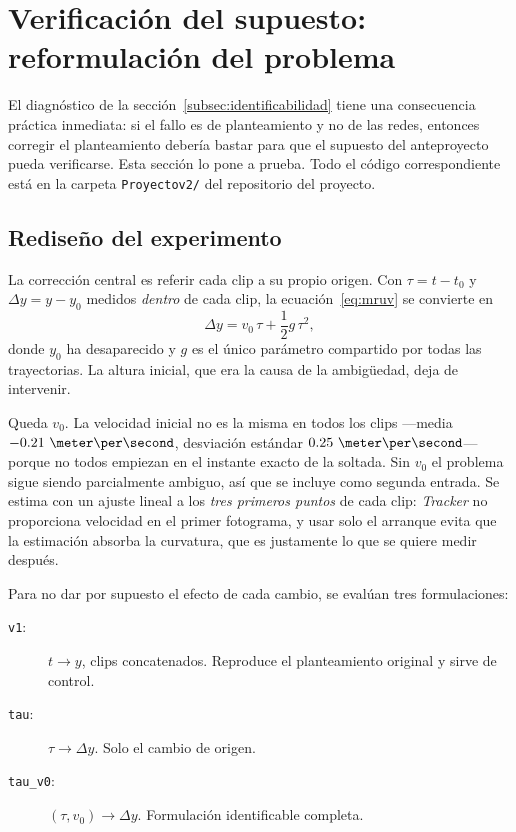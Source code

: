 \documentclass[titlepage,11pt]{article}
\providecommand{\num}[1]{\ensuremath{#1}}
\begin{document}
\section{Verificación del supuesto: reformulación del problema}
\label{sec:v2}

El diagnóstico de la sección~\ref{subsec:identificabilidad} tiene una
consecuencia práctica inmediata: si el fallo es de planteamiento y no de las
redes, entonces corregir el planteamiento debería bastar para que el supuesto
del anteproyecto pueda verificarse. Esta sección lo pone a prueba. Todo el
código correspondiente está en la carpeta \texttt{Proyectov2/} del repositorio
del proyecto.

\subsection{Rediseño del experimento}
\label{subsec:rediseno}

La corrección central es referir cada clip a su propio origen. Con
$\tau = t-t_0$ y $\Delta y = y-y_0$ medidos \emph{dentro} de cada clip, la
ecuación~\eqref{eq:mruv} se convierte en
\begin{equation}
  \Delta y = v_0\,\tau + \frac{1}{2}g\,\tau^2,
  \label{eq:mruv_ref}
\end{equation}
donde $y_0$ ha desaparecido y $g$ es el único parámetro compartido por todas
las trayectorias. La altura inicial, que era la causa de la ambigüedad, deja de
intervenir.

Queda $v_0$. La velocidad inicial no es la misma en todos los clips ---media
$\num{-0.21}~\meter\per\second$, desviación estándar
$\num{0.25}~\meter\per\second$--- porque no todos empiezan en el instante exacto
de la soltada. Sin $v_0$ el problema sigue siendo parcialmente ambiguo, así que
se incluye como segunda entrada. Se estima con un ajuste lineal a los
\emph{tres primeros puntos} de cada clip: \emph{Tracker} no proporciona
velocidad en el primer fotograma, y usar solo el arranque evita que la
estimación absorba la curvatura, que es justamente lo que se quiere medir
después.

Para no dar por supuesto el efecto de cada cambio, se evalúan tres
formulaciones:

\begin{description}
\item[\texttt{v1}:] $t\to y$, clips concatenados. Reproduce el planteamiento
  original y sirve de control.
\item[\texttt{tau}:] $\tau\to\Delta y$. Solo el cambio de origen.
\item[\texttt{tau\_v0}:] $(\tau,v_0)\to\Delta y$. Formulación identificable
  completa.
\end{description}
\end{document}
